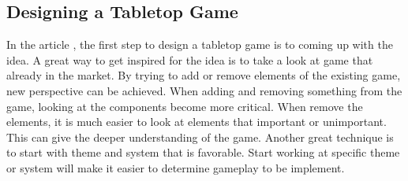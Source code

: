 \documentclass[12pt]{article}
\begin{document}
\subsection{Designing a Tabletop Game}
In the article \cite{design423}, the first step to design a tabletop game is to coming up with the idea. A great way to get inspired for the idea is to take a look at game that already in the market. By trying to add or remove elements of the existing game, new perspective can be achieved. When adding and removing something from the game, looking at the components become more critical. When remove the elements, it is much easier to look at elements that important or unimportant. This can give the deeper understanding of the game. Another great technique is to start with theme and system that is favorable. Start working at specific theme or system will make it easier to determine gameplay to be implement. 
\end{document}

